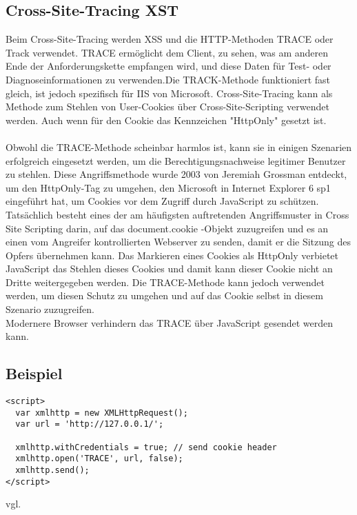 {\subsection{Cross-Site-Tracing XST}
\label{sec:CSTXST}
Beim Cross-Site-Tracing werden XSS und die HTTP-Methoden TRACE oder Track verwendet. TRACE ermöglicht dem Client, zu sehen, was am anderen Ende der Anforderungskette empfangen wird, und diese Daten für Test- oder Diagnoseinformationen zu verwenden.Die TRACK-Methode funktioniert fast gleich, ist jedoch spezifisch für IIS von Microsoft. Cross-Site-Tracing kann als Methode zum Stehlen von User-Cookies über Cross-Site-Scripting verwendet werden. Auch wenn für den Cookie das Kennzeichen "HttpOnly" gesetzt ist.
\\ \\
Obwohl die TRACE-Methode scheinbar harmlos ist, kann sie in einigen Szenarien erfolgreich eingesetzt werden, um die Berechtigungsnachweise legitimer Benutzer zu stehlen. Diese Angriffsmethode wurde 2003 von Jeremiah Grossman entdeckt, um den HttpOnly-Tag zu umgehen, den Microsoft in Internet Explorer 6 sp1 eingeführt hat, um Cookies vor dem Zugriff durch JavaScript zu schützen. Tatsächlich besteht eines der am häufigsten auftretenden Angriffsmuster in Cross Site Scripting darin, auf das document.cookie -Objekt zuzugreifen und es an einen vom Angreifer kontrollierten Webserver zu senden, damit er die Sitzung des Opfers übernehmen kann. Das Markieren eines Cookies als HttpOnly verbietet JavaScript das Stehlen dieses Cookies und damit kann dieser Cookie nicht an Dritte weitergegeben werden. Die TRACE-Methode kann jedoch verwendet werden, um diesen Schutz zu umgehen und auf das Cookie selbst in diesem Szenario zuzugreifen.
\\
Modernere Browser verhindern das TRACE über JavaScript gesendet werden kann.
\pagebreak
\subsection{Beispiel}
\label{sec:cst_bsp}
\begin{lstlisting}[caption={Cross Site Tracing}]
<script>
  var xmlhttp = new XMLHttpRequest();
  var url = 'http://127.0.0.1/';

  xmlhttp.withCredentials = true; // send cookie header
  xmlhttp.open('TRACE', url, false);
  xmlhttp.send();
</script>
\end{lstlisting}
vgl. \textcite{XST}
}
